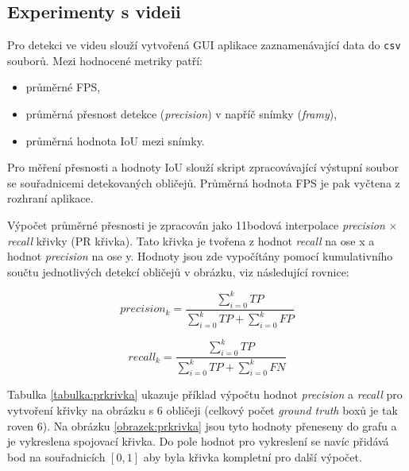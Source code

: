 \subsection*{Experimenty s videii}
Pro detekci ve videu slouží vytvořená GUI aplikace zaznamenávající data do \texttt{csv} souborů. Mezi hodnocené metriky patří:

\begin{itemize}
  \item průměrné FPS,
  \item průměrná přesnost detekce (\emph{precision}) v napříč snímky (\emph{framy}),
  \item průměrná hodnota IoU mezi snímky.
\end{itemize}

Pro měření přesnosti a hodnoty IoU slouží skript zpracovávající výstupní soubor se souřadnicemi detekovaných obličejů. Průměrná hodnota FPS je pak vyčtena z rozhraní aplikace.

Výpočet průměrné přesnosti je zpracován jako 11bodová interpolace \cite{interpolace} \emph{precision} $\times$ \emph{recall} křivky (PR křivka). Tato křivka je tvořena z hodnot \emph{recall} na ose x a hodnot \emph{precision} na ose y. Hodnoty jsou zde vypočítány pomocí kumulativního součtu jednotlivých detekcí obličejů v obrázku, viz následující rovnice:

\begin{equation}
  precision_k = \frac{\sum_{i=0}^{k} TP}{\sum_{i=0}^{k} TP + \sum_{i=0}^{k} FP}
\end{equation}

\begin{equation}
  recall_k = \frac{\sum_{i=0}^{k} TP}{\sum_{i=0}^{k} TP + \sum_{i=0}^{k} FN}
\end{equation}

Tabulka \ref{tabulka:prkrivka} ukazuje příklad výpočtu hodnot \emph{precision} a \emph{recall} pro vytvoření křivky na obrázku s 6 obličeji (celkový počet \emph{ground truth} boxů je tak roven 6). Na obrázku \ref{obrazek:prkrivka} jsou tyto hodnoty přeneseny do grafu a je vykreslena spojovací křivka. Do pole hodnot pro vykreslení se navíc přidává bod na souřadnicích $[0, 1]$ aby byla křivka kompletní pro další výpočet.


